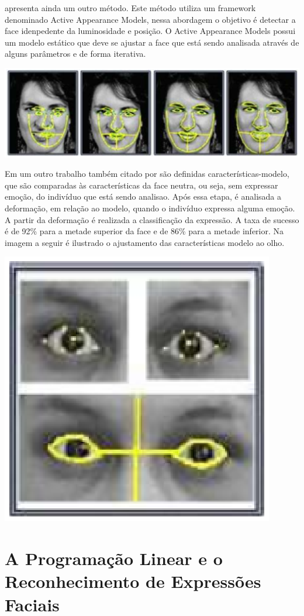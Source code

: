  apresenta ainda um outro método. Este método utiliza um framework denominado Active Appearance Models, nessa abordagem o objetivo é detectar a face idenpedente da luminosidade e posição. O  Active Appearance Models
possui um modelo estático que deve se ajustar a face que está sendo analisada através de alguns parâmetros e de forma iterativa.
\begin{center}
	\includegraphics[scale=1.00]{graficos/metodo2_classi}
\end{center}

Em um outro trabalho também citado por  são definidas características-modelo, que são comparadas às características da face neutra, ou seja, sem expressar emoção, do indivíduo que está sendo analisao. Após essa etapa, é analisada a deformação, em relação ao modelo, quando o indivíduo expressa alguma emoção. A partir da deformação é realizada a classificação da expressão. A taxa de sucesso é de 92\% para a metade superior da face e de
86\% para a metade inferior. Na imagem a seguir é ilustrado o ajustamento das características modelo ao olho.
\begin{center}
	\includegraphics[scale=1.00]{graficos/metodo3_classi}
\end{center}
\section{A Programação Linear e o Reconhecimento de Expressões Faciais}
